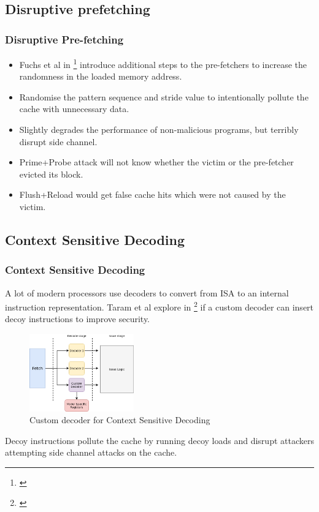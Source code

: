 \documentclass[10pt]{beamer}
\begin{document}
\subsection{Disruptive prefetching}
\begin{frame}
\frametitle{Disruptive Pre-fetching}
\begin{itemize}
    \item Fuchs et al in \footnote{\cite{disruptive_prefetch}} introduce additional steps to the pre-fetchers to increase the randomness
in the loaded memory address.
\item Randomise the pattern sequence and stride value to intentionally pollute the cache with unnecessary data.
\item Slightly degrades the performance of non-malicious programs, but terribly disrupt side channel.
\item Prime+Probe attack will not know whether the victim or the pre-fetcher evicted its block.
\item Flush+Reload would get false cache hits which were not caused by the victim.
\end{itemize}
\end{frame}

\subsection{Context Sensitive Decoding}
\begin{frame}
\frametitle{Context Sensitive Decoding}
A lot of modern processors use decoders to convert from ISA to an internal instruction
    representation. Taram et al explore in \footnote{\cite{csd}} if a custom decoder can insert decoy
instructions to improve security.
\begin{figure}
\centering
\includegraphics[width=0.4\textwidth]{csd}
\caption{Custom decoder for Context Sensitive Decoding}
\end{figure}
Decoy instructions pollute the cache by running decoy loads and
disrupt attackers attempting side channel attacks on the cache.
\end{frame}
\end{document}
